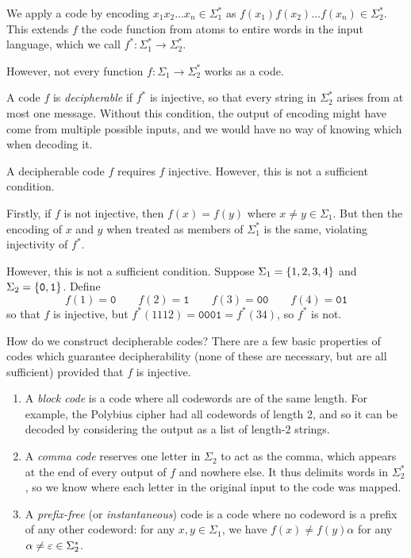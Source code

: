 \documentclass{article}
\begin{document}
We apply a code by encoding $x_1x_2\dots x_n \in \Sigma_1^*$ as $f(x_1)f(x_2)\dots f(x_n) \in \Sigma_2^*$. This extends $f$ the code function from atoms to entire words in the input language, which we call $f^*: \Sigma_1^* \to \Sigma_2^*$.

However, not every function $f: \Sigma_1 \to \Sigma_2^*$ works as a code.

\begin{definition}[Decipherable]
	\label{decipherable-definition}
    A code $f$ is \textit{decipherable} if $f^*$ is injective, so that every string in $\Sigma_2^*$ arises from at most one message. Without this condition, the output of encoding might have come from multiple possible inputs, and we would have no way of knowing which when decoding it.
\end{definition}

\begin{proposition}
	\label{decipherability-requires-injectivity}
	A decipherable code $f$ requires $f$ injective. However, this is not a sufficient condition.
\end{proposition}

\begin{prf}
    Firstly, if $f$ is not injective, then $f(x) = f(y)$ where $x \neq y \in \Sigma_1$. But then the encoding of $x$ and $y$ when treated as members of $\Sigma_1^*$ is the same, violating injectivity of $f^*$.
    
    However, this is not a sufficient condition. Suppose $\Sigma_1 = \left\lbrace 1, 2, 3, 4 \right\rbrace$ and $\Sigma_2 = \left\lbrace \texttt{0}, \texttt{1} \right\rbrace$. Define
    \[
	f(1) = \texttt{0} \qquad f(2) = \texttt{1} \qquad f(3) = \texttt{00} \qquad f(4) = \texttt{01}
	\]
	so that $f$ is injective, but $f^*(1112) = \texttt{0001} = f^*(34)$, so $f^*$ is not.
\end{prf}

How do we construct decipherable codes? There are a few basic properties of codes which guarantee decipherability (none of these are necessary, but are all sufficient) provided that $f$ is injective.
\begin{enumerate}
    \item A \textit{block code} is a code where all codewords are of the same length. For example, the Polybius cipher had all codewords of length 2, and so it can be decoded by considering the output as a list of length-2 strings.
    \item A \textit{comma code} reserves one letter in $\Sigma_2$ to act as the comma, which appears at the end of every output of $f$ and nowhere else. It thus delimits words in $\Sigma_2^*$, so we know where each letter in the original input to the code was mapped.
    \item A \textit{prefix-free} (or \textit{instantaneous}) code is a code where no codeword is a prefix of any other codeword: for any $x, y \in \Sigma_1$, we have $f(x) \neq f(y)\alpha$ for any $\alpha \neq \varepsilon \in \Sigma_2^*$.
\end{enumerate}
\end{document}
